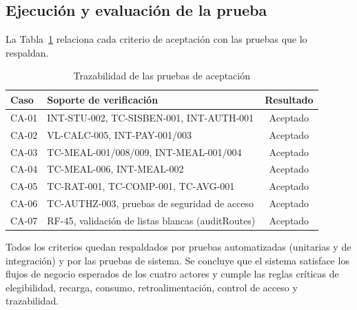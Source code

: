\documentclass[stu,11pt,floatsintext]{apa7}
\begin{document}
\subsection{Ejecución y evaluación de la prueba}
La Tabla~\ref{tab:aceptacion} relaciona cada criterio de aceptación con las pruebas que
lo respaldan.

\begin{table}[H]
\centering
\caption{Trazabilidad de las pruebas de aceptación}
\label{tab:aceptacion}
\begin{tabularx}{\textwidth}{l X c}
\toprule
\textbf{Caso} & \textbf{Soporte de verificación} & \textbf{Resultado} \\
\midrule
CA-01 & INT-STU-002, TC-SISBEN-001, INT-AUTH-001 & Aceptado \\
CA-02 & VL-CALC-005, INT-PAY-001/003 & Aceptado \\
CA-03 & TC-MEAL-001/008/009, INT-MEAL-001/004 & Aceptado \\
CA-04 & TC-MEAL-006, INT-MEAL-002 & Aceptado \\
CA-05 & TC-RAT-001, TC-COMP-001, TC-AVG-001 & Aceptado \\
CA-06 & TC-AUTHZ-003, pruebas de seguridad de acceso & Aceptado \\
CA-07 & RF-45, validación de listas blancas (auditRoutes) & Aceptado \\
\bottomrule
\end{tabularx}
\end{table}

\noindent Todos los criterios quedan respaldados por pruebas automatizadas (unitarias y
de integración) y por las pruebas de sistema. Se concluye que el sistema satisface los
flujos de negocio esperados de los cuatro actores y cumple las reglas críticas de
elegibilidad, recarga, consumo, retroalimentación, control de acceso y trazabilidad.

\end{document}
